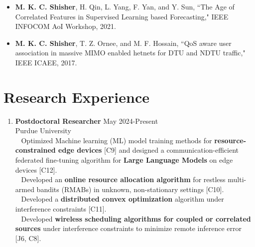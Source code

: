 \documentclass[letterpaper,11pt]{article}
\begin{document}
{\begin{itemize}
\item[C2.] \textbf{M. K. C. Shisher}, H. Qin, L. Yang, F. Yan, and Y. Sun,
``The Age of Correlated Features in Supervised Learning based Forecasting," {IEEE INFOCOM AoI Workshop, 2021}.

\item[C1.] \textbf{M. K. C. Shisher}, T. Z. Ornee, and M. F. Hossain,
 ``QoS aware user association in massive MIMO enabled hetnets for DTU and NDTU traffic," {IEEE ICAEE, 2017}.
\end{itemize}}


\section{Research Experience}
\begin{enumerate}[label=\arabic*, leftmargin=*, topsep=2pt, itemsep=0pt]
    \item {\bf Postdoctoral Researcher} \hfill May 2024-Present\\
    Purdue University \\
     \vspace{2pt}
   \textopenbullet~  Optimized Machine learning (ML) model training methods for {\bf resource-constrained edge devices} [C9] and designed a communication-efficient federated fine-tuning algorithm for {\bf Large Language Models} on edge devices [C12]. \\
   \vspace{2pt}
   \textopenbullet~ Developed
   an {\bf online resource allocation algorithm} for restless multi-armed bandits (RMABs) in unknown, non-stationary settings [C10].  \\
     \vspace{2pt}
    \textopenbullet~ Developed a {\bf distributed convex optimization} algorithm under interference constraints [C11].  \\
    
    \vspace{2pt}
     \textopenbullet~ Developed {\bf wireless scheduling algorithms for coupled or correlated sources} under interference constraints to minimize remote inference error [J6, C8]. \\


\end{enumerate}
\end{document}
